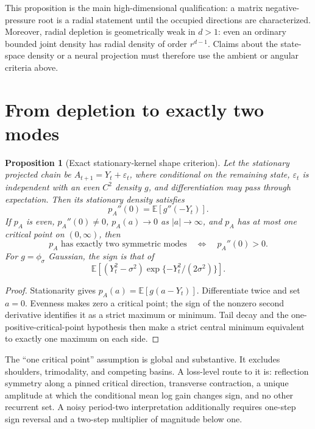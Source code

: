 \documentclass[10pt]{article}
\newtheorem{proposition}[theorem]{Proposition}
\theoremstyle{definition}
\theoremstyle{remark}
\newcommand{\E}{\mathbb E}
\begin{document}
This proposition is the main high-dimensional qualification: a matrix
negative-pressure root is a radial statement until the occupied directions
are characterized.  Moreover, radial depletion is geometrically weak in
$d>1$: even an ordinary bounded joint density has radial density of order
$r^{d-1}$.  Claims about the state-space density or a neural projection must
therefore use the ambient or angular criteria above.

\section{From depletion to exactly two modes}

\begin{proposition}[Exact stationary-kernel shape criterion]
\label{prop:shape}
Let the stationary projected chain be
$A_{t+1}=Y_t+\varepsilon_t$, where conditional on the remaining state,
$\varepsilon_t$ is independent with an even $C^2$ density $g$, and
differentiation may pass through expectation.  Then its stationary density
satisfies
\begin{equation}
 p_A''(0)=\E[g''(-Y_t)].
 \label{eq:kernel-curvature}
\end{equation}
If $p_A$ is even, $p_A''(0)\ne0$, $p_A(a)\to0$ as $|a|\to\infty$, and
$p_A$ has at most one critical point on $(0,\infty)$, then
\begin{equation}
 p_A\text{ has exactly two symmetric modes}
 \quad\Longleftrightarrow\quad p_A''(0)>0.
 \label{eq:shape-iff}
\end{equation}
For $g=\phi_\sigma$ Gaussian, the sign is that of
\begin{equation}
 \E\!\left[(Y_t^2-\sigma^2)
 \exp\{-Y_t^2/(2\sigma^2)\}\right].
 \label{eq:gaussian-shape}
\end{equation}
\end{proposition}

\begin{proof}
Stationarity gives $p_A(a)=\E[g(a-Y_t)]$.  Differentiate twice and set
$a=0$.  Evenness makes zero a critical point; the sign of the nonzero second
derivative identifies it as a strict maximum or minimum.  Tail decay and the
one-positive-critical-point hypothesis then make a strict central minimum
equivalent to exactly one maximum on each side.
\end{proof}

The ``one critical point'' assumption is global and substantive.  It excludes
shoulders, trimodality, and competing basins.  A loss-level route to it is:
reflection symmetry along a pinned critical direction, transverse
contraction, a unique amplitude at which the conditional mean log gain
changes sign, and no other recurrent set.  A noisy period-two interpretation
additionally requires one-step sign reversal and a two-step multiplier of
magnitude below one.
\end{document}
